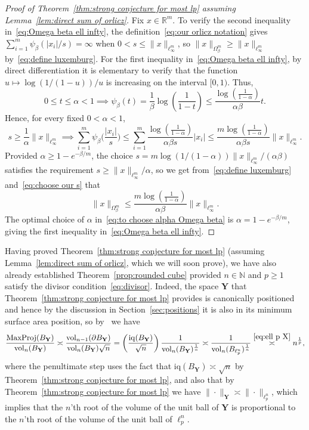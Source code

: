 \documentclass[11pt,reqno]{amsart}
\renewcommand{\le}{\leqslant}
\renewcommand{\ge}{\geqslant}
\newcommand{\Y}{\mathbf Y}
\newcommand{\R}{\mathbb R}
\theoremstyle{remark}
\newcommand{\iq}{\mathrm{iq}}
\newcommand{\N}{\mathbb N}
\newcommand{\vol}{\mathrm{vol}}
\renewcommand{\1}{\mathbf 1}
\begin{document}
\begin{proof}[Proof of Theorem~\ref{thm:strong conjecture for most lp} assuming Lemma~\ref{lem:direct sum of orlicz}]
Fix $x\in \R^m$. To verify the second inequality in~\eqref{eq:Omega beta ell infty},  the definition~\eqref{eq:our orlicz notation} gives $\sum_{i=1}^m \psi_{\!\!\beta}(|x_i|/s)=\infty$ when $0<s\le \|x\|_{\ell_\infty^m}$, so $\|x\|_{\Omega_\beta^m}\ge \|x\|_{\ell_\infty^m}$ by~\eqref{eq:define luxemburg}. For the first inequality in~\eqref{eq:Omega beta ell infty}, by direct differentiation it is elementary to  verify that   the function $u\mapsto \log (1/(1-u))/u$ is increasing on the interval $[0,1)$. Thus,
$$
0\le t\le \alpha< 1\implies \psi_{\!\!\beta}(t)=\frac{1}{\beta}\log\left(\frac{1}{1-t}\right)\le \frac{\log\left(\frac{1}{1-\alpha}\right)}{\alpha \beta}t.
$$
Hence, for every fixed $0<\alpha<1$,
\begin{equation}\label{eq:choose our s}
s\ge \frac{1}{\alpha}\|x\|_{\ell_\infty^m}\implies \sum_{i=1}^m \psi_{\!\!\beta}\Big(\frac{|x_i|}{s}\Big)\le \sum_{i=1}^m \frac{\log\left(\frac{1}{1-\alpha}\right)}{\alpha \beta s}|x_i|\le \frac{m\log\left(\frac{1}{1-\alpha}\right)}{\alpha \beta s}\|x\|_{\ell_\infty^m}.
\end{equation}
Provided  $\alpha\ge 1-e^{-\beta/m}$, the choice $s=m\log(1/(1-\alpha))\|x\|_{\ell_\infty^m}/(\alpha\beta)$ satisfies the requirement $s\ge \|x\|_{\ell_\infty^m}/\alpha$, so we get from~\eqref{eq:define luxemburg} and~\eqref{eq:choose our s} that
\begin{equation}\label{eq:to choose alpha Omega beta}
\|x\|_{\Omega_\beta^m}\le\frac{m\log\left(\frac{1}{1-\alpha}\right)}{\alpha \beta }\|x\|_{\ell_\infty^m}.
\end{equation}
The optimal choice of $\alpha$ in~\eqref{eq:to choose alpha Omega beta} is $\alpha= 1-e^{-\beta/m}$, giving the first inequality in~\eqref{eq:Omega beta ell infty}.
\end{proof}


Having proved Theorem~\ref{thm:strong conjecture for most lp} (assuming Lemma~\ref{lem:direct sum of orlicz}, which we will soon prove), we have also already established Theorem~\ref{prop:rounded cube} provided $n\in \N$ and $p\ge 1$ satisfy the divisor condition~\eqref{eq:divisor}. Indeed, the space $\Y$ that Theorem~\ref{thm:strong conjecture for most lp} provides is canonically positioned and hence by the discussion in Section~\ref{sec:positions} it is also  in its minimum surface area position, so by~\cite[Proposition~3.1]{GP99} we have
$$
\frac{\mathrm{MaxProj}(B_\Y)}{\vol_n(B_{\Y})}\asymp \frac{\vol_{n-1}(\partial B_{\Y})}{\vol_n(B_{\Y})\sqrt{n}}=\left(\frac{\iq(B_{\Y})}{\sqrt{n}}\right)\frac{1}{\vol_n(B_{\Y})^{\frac{1}{n}}}
\asymp \frac{1}{\vol_n(B_{\ell_p^n})^{\frac{1}{n}}}\stackrel{\eqref{eq:ell p X}}{\asymp} n^{\frac{1}{p}},
$$
where the penultimate step uses the fact that $\iq(B_\Y)\asymp\sqrt{n}$ by Theorem~\ref{thm:strong conjecture for most lp}, and also that by Theorem~\ref{thm:strong conjecture for most lp} we have  $\|\cdot\|_\Y\asymp \|\cdot\|_{\ell_p^n}$,  which implies that the $n$'th root of the volume of the unit ball of $\Y$ is proportional to the $n$'th root of the volume of the unit ball of $\ell_p^n$.
\end{document}
